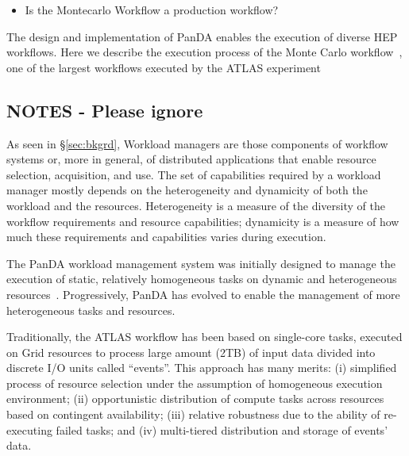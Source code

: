 
\begin{itemize}
    \item Is the Montecarlo Workflow a production workflow?
\end{itemize}

The design and implementation of PanDA enables the execution of diverse HEP workflows. Here we describe the execution process of the Monte Carlo workflow~\cite{montecarlo_workflow}, one of the largest workflows
executed by the ATLAS experiment

\subsection{NOTES - Please ignore}

As seen in \S\ref{sec:bkgrd}, Workload managers are those components of workflow
systems or, more in general, of distributed applications that enable resource
selection, acquisition, and use. The set of capabilities required by a workload
manager mostly depends on the heterogeneity and dynamicity of both the workload
and the resources. Heterogeneity is a measure of the diversity of the workflow
requirements and resource capabilities; dynamicity is a measure of how much
these requirements and capabilities varies during execution.

The PanDA workload management system was initially designed to manage the
execution of static, relatively homogeneous tasks on dynamic and heterogeneous
resources~\cite{panda_grid}. Progressively, PanDA has evolved to enable the
management of more heterogeneous tasks and resources.


Traditionally, the ATLAS workflow has been based on single-core tasks, executed
on Grid resources to process large amount (2TB) of input data divided into
discrete I/O units called ``events''. This approach has many merits: (i)
simplified process of resource selection under the assumption of homogeneous
execution environment; (ii) opportunistic distribution of compute tasks across
resources based on contingent availability; (iii) relative robustness due to the
ability of re-executing failed tasks; and (iv) multi-tiered distribution and
storage of events' data.

